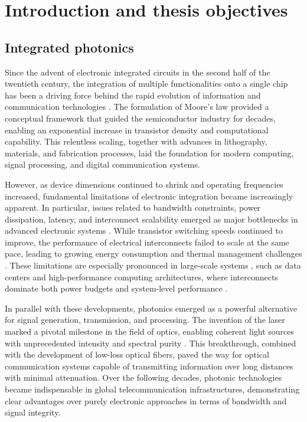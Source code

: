 
\chapter{Introduction and thesis objectives} \label{chap:intro}

\section{Integrated photonics} \label{sec:integrated_photonics}

Since the advent of electronic integrated circuits in the second half of the twentieth century, 
the integration of multiple functionalities onto a single chip has been a driving force behind 
the rapid evolution of information and communication technologies 
\cite{mooreCrammingMoreComponents1965a}. The formulation of Moore's law provided a conceptual 
framework that guided the semiconductor industry for decades, enabling an exponential increase in 
transistor density and computational capability. This relentless scaling, together with advances 
in lithography, materials, and fabrication processes, laid the foundation for modern computing, 
signal processing, and digital communication systems.

However, as device dimensions continued to shrink and operating frequencies increased, fundamental 
limitations of electronic integration became increasingly apparent. In particular, issues related 
to bandwidth constraints, power dissipation, latency, and interconnect scalability emerged as major
bottlenecks in advanced electronic systems \cite{millerRationaleChallengesOptical2000}. While 
transistor switching speeds continued to improve, the performance of electrical interconnects 
failed to scale at the same pace, leading to growing energy consumption and thermal management 
challenges \cite{millerDeviceRequirementsOptical2009}. These limitations are especially pronounced 
in large-scale systems \cite{littleVERYLARGESCALEINTEGRATED2000}, such as data centers and 
high-performance computing architectures, where interconnects dominate both power budgets and 
system-level performance \cite{shalfExascaleComputingTechnology2011}.

In parallel with these developments, photonics emerged as a powerful alternative for signal 
generation, transmission, and processing. The invention of the laser marked a pivotal milestone in 
the field of optics, enabling coherent light sources with unprecedented intensity and spectral 
purity \cite{maimanStimulatedOpticalRadiation1960}. This breakthrough, combined with the 
development of low-loss optical fibers, paved the way for optical communication systems capable of 
transmitting information over long distances with minimal attenuation. Over the following decades, 
photonic technologies became indispensable in global telecommunication infrastructures, 
demonstrating clear advantages over purely electronic approaches in terms of bandwidth and signal 
integrity.

